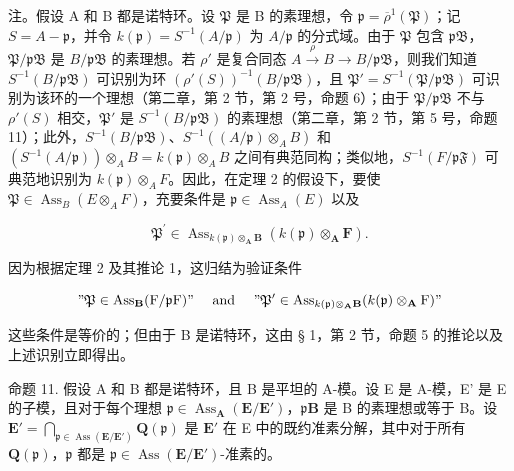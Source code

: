   注。假设 A 和 B 都是诺特环。设 \(\mathfrak{P}\) 是 B 的素理想，令 \(\mathfrak{p} = \overline{\rho}^{1}(\mathfrak{P})\)；记 \(S = A - \mathfrak{p}\)，并令 \(k(\mathfrak{p}) = S^{-1}(A / \mathfrak{p})\) 为 \(A / \mathfrak{p}\) 的分式域。由于 \(\mathfrak{P}\) 包含 \(\mathfrak{pB}\)，\(\mathfrak{P} / \mathfrak{pB}\) 是 \(B / \mathfrak{pB}\) 的素理想。若 \(\rho'\) 是复合同态 \(A \xrightarrow{\rho} B \to B / \mathfrak{pB}\)，则我们知道 \(S^{-1}(B / \mathfrak{pB})\) 可识别为环 \((\rho'(S))^{-1}(B / \mathfrak{pB})\)，且 \(\mathfrak{P}' = S^{-1}(\mathfrak{P} / \mathfrak{pB})\) 可识别为该环的一个理想（第二章，第 2 节，第 2 号，命题 6）；由于 \(\mathfrak{P} / \mathfrak{pB}\) 不与 \(\rho'(S)\) 相交，\(\mathfrak{P}'\) 是 \(S^{-1}(B / \mathfrak{pB})\) 的素理想（第二章，第 2 节，第 5 号，命题 11）；此外，\(S^{-1}(B / \mathfrak{pB})\)、\(S^{-1}((A / \mathfrak{p}) \otimes_{A} B)\) 和 \((S^{-1}(A / \mathfrak{p})) \otimes_{A} B = k(\mathfrak{p}) \otimes_{A} B\) 之间有典范同构；类似地，\(S^{-1}(F / \mathfrak{pF})\) 可典范地识别为 \(k(\mathfrak{p}) \otimes_{A} F\)。因此，在定理 2 的假设下，要使 \(\mathfrak{P} \in \operatorname{Ass}_{B}(E \otimes_{A} F)\)，充要条件是 \(\mathfrak{p} \in \operatorname{Ass}_{A}(E)\) 以及

\[
\mathfrak {P} ^ {\prime} \in \operatorname{Ass} _ {k (\mathfrak {p}) \otimes_ {\mathbf {A}} \mathbf {B}} (k (\mathfrak {p}) \otimes_ {\mathbf {A}} \mathbf {F}).
\]

因为根据定理 2 及其推论 1，这归结为验证条件

\[
" \mathfrak {P} \in \operatorname{Ass} _ {\mathbf {B}} (\mathrm{F} / \mathfrak {p} \mathrm{F})" \quad \text { and } \quad " \mathfrak {P} ^ {\prime} \in \operatorname{Ass} _ {k (\mathfrak {p}) \otimes_ {\mathbf {A}} \mathbf {B}} (k (\mathfrak {p}) \otimes_ {\mathbf {A}} \mathrm{F})"
\]

这些条件是等价的；但由于 B 是诺特环，这由 § 1，第 2 节，命题 5 的推论以及上述识别立即得出。

命题 11. 假设 A 和 B 都是诺特环，且 B 是平坦的 A-模。设 E 是 A-模，E' 是 E 的子模，且对于每个理想 \(\mathfrak{p} \in \operatorname{Ass}_{\mathbf{A}}(\mathbf{E}/\mathbf{E}')\)，\(\mathfrak{p}\mathbf{B}\) 是 B 的素理想或等于 B。设 \(\mathbf{E}' = \bigcap_{\mathfrak{p} \in \operatorname{Ass}(\mathbf{E}/\mathbf{E}')} \mathbf{Q}(\mathfrak{p})\) 是 \(\mathbf{E}'\) 在 E 中的既约准素分解，其中对于所有 \(\mathbf{Q}(\mathfrak{p})\)，\(\mathfrak{p}\) 都是 \(\mathfrak{p} \in \operatorname{Ass}(\mathbf{E}/\mathbf{E}')\)-准素的。

